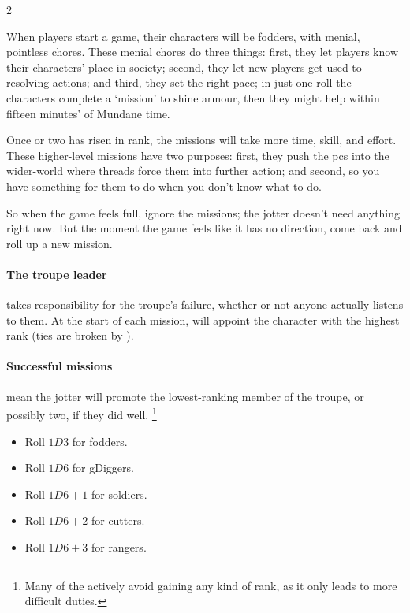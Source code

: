 \begin{multicols}{2}

\noindent
When players start a game, their characters will be \glspl{fodder}, with menial, pointless chores.
These menial chores do three things: first, they let players know their characters' place in society; second, they let new players get used to resolving actions; and third, they set the right pace;
in just one roll the characters complete a `mission' to shine armour, then they might help  within fifteen minutes' of Mundane time.

Once  or two has risen in rank, the missions will take more time, skill, and effort.
These higher-level missions have two purposes: first, they push the \glspl{pc} into the wider-world where \glspl{thread} force them into further action; and second, so you have something for them to do when you don't know what to do.

So when the game feels full, ignore the missions; the \gls{jotter} doesn't need anything right now.
But the moment the game feels like it has no direction, come back and roll up a new mission.

\paragraph{The troupe leader}
takes responsibility for the troupe's failure, whether or not anyone actually listens to them.
At the start of each mission,  will appoint the character with the highest rank (ties are broken by ).

\paragraph{Successful missions}
mean the \gls{jotter} will promote the lowest-ranking member of the troupe, or possibly two, if they did well.%
\footnote{Many of the  actively avoid gaining any kind of rank, as it only leads to more difficult duties.}

\begin{itemize}
  \item
  Roll $1D3$ for \glspl{fodder}.
  \item
  Roll $1D6$ for \glspl{gDigger}.
  \item
  Roll $1D6+1$ for \glspl{soldier}.
  \item
  Roll $1D6+2$ for \glspl{cutter}.
  \item
  Roll $1D6+3$ for \glspl{ranger}.
\end{itemize}


\end{multicols}
